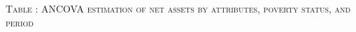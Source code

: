 \hspace{-1cm}\begin{minipage}[t]{14cm}
\hfil\textsc{\normalsize Table \thetable: ANCOVA estimation of net assets by attributes, poverty status, and period\label{tab NetAssetsTimeVaryingPovertyStatusAttributesANCOVA1}}\\
\setlength{\tabcolsep}{1pt}
\setlength{\baselineskip}{8pt}
\renewcommand{\arraystretch}{.55}
\hfil{}
\end{minipage}


